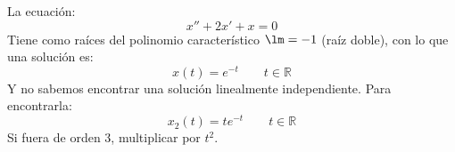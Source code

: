 \begin{ejercicio*}
    La ecuación:
    \begin{equation*}
        x'' + 2x' + x = 0
    \end{equation*}
    Tiene como raíces del polinomio característico $\lm = -1$ (raíz doble), con lo que una solución es:
    \begin{equation*}
        x(t) = e^{-t} \qquad t\in \mathbb{R}
    \end{equation*}
    Y no sabemos encontrar una solución linealmente independiente. Para encontrarla:
    \begin{equation*}
        x_2(t) = te^{-t} \qquad t\in \mathbb{R}
    \end{equation*}
    Si fuera de orden 3, multiplicar por $t^2$.
\end{ejercicio*}

